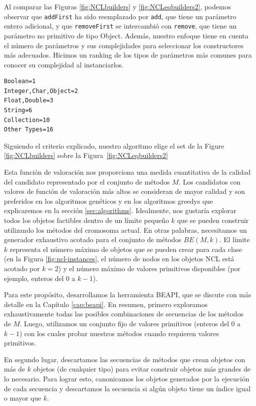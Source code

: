 Al comparar las Figuras \ref{fig:NCLbuilders} y \ref{fig:NCLeqbuilders2}, podemos observar que \texttt{addFirst} ha sido reemplazado por \texttt{add}, que tiene un parámetro entero adicional, y que \texttt{removeFirst} se intercambió con \texttt{remove}, que tiene un parámetro no primitivo de tipo Object. Además, nuestro enfoque tiene en cuenta el número de parámetros y sus complejidades para seleccionar los constructores más adecuados. Hicimos un ranking de los tipos de parámetros más comunes para conocer su complejidad al instanciarlos.

\begin{lstlisting}[label=fig:rankParameters, caption=Ranking con los tipos de parametros, captionpos=b, frame=tb, float=t]
Boolean=1
Integer,Char,Object=2
Float,Double=3
String=6
Collection=10
Other Types=16
\end{lstlisting}

Siguiendo el criterio explicado, nuestro algoritmo elige el set de la Figure \ref{fig:NCLbuilders} sobre la Figura~\ref{fig:NCLeqbuilders2}



Esta función de valoración nos proporciona una medida cuantitativa de la calidad del candidato representado por el conjunto de métodos $M$. Los candidatos con valores de función de valoración más altos se consideran de mayor calidad y son preferidos en los algoritmos genéticos y en los algoritmos greedys que explicaremos en la sección \ref{sec:algorithms}.
Idealmente, nos gustaría explorar todos los objetos factibles dentro de un límite pequeño $k$ que se pueden construir utilizando los métodos del cromosoma actual. En otras palabras, necesitamos un generador exhaustivo acotado para el conjunto de métodos $BE(M, k)$. El límite $k$ representa el número máximo de objetos que se pueden crear para cada clase (en la Figura \ref{fig:ncl-instances}, el número de nodos en los objetos NCL está acotado por $k=2$) y el número máximo de valores primitivos disponibles (por ejemplo, enteros del 0 a $k-1$).

Para este propósito, desarrollamos la herramienta BEAPI, que se discute con más detalle en la Capítulo \ref{cap:beapi}. En resumen, primero exploramos exhaustivamente todas las posibles combinaciones de secuencias de los métodos de $M$. Luego, utilizamos un conjunto fijo de valores primitivos (enteros del 0 a $k-1$) con los cuales probar nuestros métodos cuando requieren valores primitivos.

En segundo lugar, descartamos las secuencias de métodos que crean objetos con más de $k$ objetos (de cualquier tipo) para evitar construir objetos más grandes de lo necesario. Para lograr esto, canonicamos los objetos generados por la ejecución de cada secuencia y descartamos la secuencia si algún objeto tiene un índice igual o mayor que $k$.

